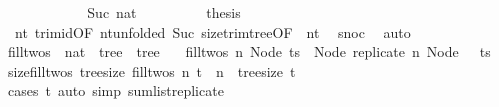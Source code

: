 \begin{isabellebody}
\isanewline
\ \ \ \ \isamarkupfalse%
\isanewline
\ \ \ \ \ \ \isamarkupfalse%
\ {\isacharparenleft}{\kern0pt}Suc\ nat{\isacharparenright}{\kern0pt}\isanewline
\ \ \ \ \ \ \isamarkupfalse%
\ \isamarkupfalse%
\ {\isacharquery}{\kern0pt}thesis\ \isamarkupfalse%
\ {}\ nt{\isacharprime}{\kern0pt}\ trim{\isacharunderscore}{\kern0pt}id{\isacharbrackleft}{\kern0pt}OF\ nt{\isacharprime}{\kern0pt}{\isacharbrackleft}{\kern0pt}unfolded\ Suc{\isacharbrackright}{\kern0pt}{\isacharbrackright}{\kern0pt}\ size{\isacharunderscore}{\kern0pt}trim{\isacharunderscore}{\kern0pt}tree{\isacharbrackleft}{\kern0pt}OF\ {\isacharunderscore}{\kern0pt}\ nt{\isacharprime}{\kern0pt}{\isacharbrackright}{\kern0pt}\ \isamarkupfalse%
\ snoc\ \isamarkupfalse%
\ auto\isanewline
\ \ \ \ \isamarkupfalse%
\isanewline
\ \ \isamarkupfalse%
\isanewline
{}\isamarkupfalse%
%
\endisatagproof
{\isafoldproof}%
%
\isadelimproof
\isanewline
%
\endisadelimproof
\isanewline
{}\isamarkupfalse%
\ fill{\isacharunderscore}{\kern0pt}twos\ {\isacharcolon}{\kern0pt}{\isacharcolon}{\kern0pt}\ {\isachardoublequoteopen}nat\ {\isasymRightarrow}\ tree\ {\isasymRightarrow}\ tree{\isachardoublequoteclose}\ \isanewline
\ \ {\isachardoublequoteopen}fill{\isacharunderscore}{\kern0pt}twos\ n\ {\isacharparenleft}{\kern0pt}Node\ ts{\isacharparenright}{\kern0pt}\ {\isacharequal}{\kern0pt}\ Node\ {\isacharparenleft}{\kern0pt}replicate\ n\ {\isacharparenleft}{\kern0pt}Node\ {\isacharbrackleft}{\kern0pt}{\isacharbrackright}{\kern0pt}{\isacharparenright}{\kern0pt}\ {\isacharat}{\kern0pt}\ ts{\isacharparenright}{\kern0pt}{\isachardoublequoteclose}\isanewline
\isanewline
{}\isamarkupfalse%
\ size{\isacharunderscore}{\kern0pt}fill{\isacharunderscore}{\kern0pt}twos{\isacharcolon}{\kern0pt}\ {\isachardoublequoteopen}tree{\isacharunderscore}{\kern0pt}size\ {\isacharparenleft}{\kern0pt}fill{\isacharunderscore}{\kern0pt}twos\ n\ t{\isacharparenright}{\kern0pt}\ {\isacharequal}{\kern0pt}\ n\ {\isacharplus}{\kern0pt}\ tree{\isacharunderscore}{\kern0pt}size\ t{\isachardoublequoteclose}\isanewline
%
\isadelimproof
\ \ %
\endisadelimproof
%
\isatagproof
{}\isamarkupfalse%
\ {\isacharparenleft}{\kern0pt}cases\ t{\isacharparenright}{\kern0pt}\ {\isacharparenleft}{\kern0pt}auto\ simp{\isacharcolon}{\kern0pt}\ sum{\isacharunderscore}{\kern0pt}list{\isacharunderscore}{\kern0pt}replicate{\isacharparenright}{\kern0pt}%

\end{isabellebody}
